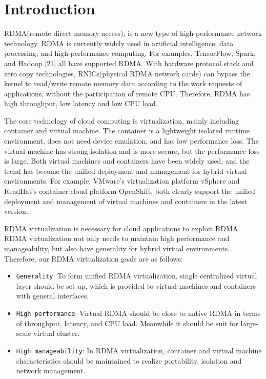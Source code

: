 \section{Introduction}
RDMA(remote direct memory access), is a new type of high-performance network technology. RDMA is currently widely used in artificial intelligence, data processing, and high-performance computing. For examples, TensorFlow, Spark, and Hadoop [21] all have supported RDMA. With hardware protocol stack and zero copy technologies, RNICs(physical RDMA network cards) can bypass the kernel to read/write remote memory data according to the work requests of applications, without the participation of remote CPU. Therefore, RDMA has high throughput, low latency and low CPU load.

The core technology of cloud computing is virtualization, mainly including container and virtual machine. The container is a lightweight isolated runtime environment, does not need device emulation, and has low performance loss. The virtual machine has strong isolation and is more secure, but the performance loss is large. Both virtual machines and containers have been widely used, and the trend has become the unified deployment and management for hybrid virtual environments. For example, VMware's virtualization platform vSphere and ReadHat's container cloud platform OpenShift, both clearly support the unified deployment and management of virtual machines and containers in the latest version.

RDMA virtualization is necessary for cloud applications to exploit RDMA. RDMA virtualization not only needs to maintain high performance and manageability, but also have generality for hybrid virtual environments. Therefore, our RDMA virtualization goals are as follows:

\begin{itemize}
\item {\verb|Generality|}: To form unified RDMA virtualization, single centralized virtual layer should be set up, which is provided to virtual machines and containers with general interfaces.
\item {\verb|High performance|}: Virtual RDMA should be close to native RDMA in terms of throughput, latency, and CPU load. Meanwhile it should be suit for large-scale virtual cluster.
\item {\verb|High manageability|}: In RDMA virtualization, container and virtual machine characteristics should be maintained to realize portability, isolation and network management.
\end{itemize}

